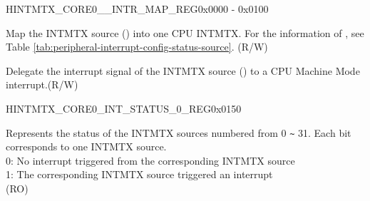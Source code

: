 \begin{register}{H}{INTMTX\_CORE0\_\_INTR\_MAP\_REG}{0x0000 - 0x0100}\label{INTMTXCORE0SOURCEINTRMAPREG}
%
%
%
%
\regnewline%
\begin{regdesc}\begin{reglist}
\label{INTMTXCORE0SOURCEINTRMAP}\item [INTMTX\_CORE0\_\regindex{SOURCE}\_INTR\_MAP] Map the INTMTX source () into one CPU INTMTX. For the information of , see Table \ref{tab:peripheral-interrupt-config-status-source}. (R/W)
\label{INTMTXCORE0SOURCEINTRPASSINSEC}\item
[INTMTX\_CORE0\_\regindex{SOURCE}\_INTR\_PASS\_IN\_SEC]
Delegate the interrupt signal of the INTMTX source () to a CPU Machine Mode interrupt.(R/W)
\end{reglist}\end{regdesc}
\end{register}




\begin{register}{H}{INTMTX\_CORE0\_INT\_STATUS\_0\_REG}{0x0150}\label{regdesc:INTMTXCORE0INTSTATUS0REG}
%
\regnewline%
\begin{regdesc}\begin{reglist}
\label{fielddesc:INTMTXCORE0INTSTATUS0}\item [INTMTX\_CORE0\_INT\_STATUS\_0] Represents the status of the INTMTX sources numbered from 0 \verb+~+ 31. Each bit corresponds to one INTMTX source.\\
0: No interrupt triggered from the corresponding INTMTX source \\
1: The corresponding INTMTX source triggered an interrupt \\(RO)
\end{reglist}\end{regdesc}
\end{register}


